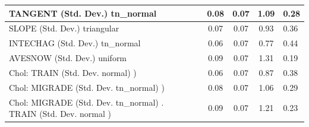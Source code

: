 \begin{table}
\begin{center}
\begin{tabular}{|l|l|c|c|c|l|}
			\hline
			TANGENT (Std. Dev.) tn_normal &  & 0.08 & 0.07 & 1.09 & 0.28 \\
			\hline
			SLOPE (Std. Dev.) triangular &  & 0.07 & 0.07 & 0.93 & 0.36 \\
			\hline
			INTECHAG (Std. Dev.) tn_normal &  & 0.06 & 0.07 & 0.77 & 0.44 \\
			\hline
			AVESNOW (Std. Dev.) uniform &  & 0.09 & 0.07 & 1.31 & 0.19 \\
			\hline
			 Chol: TRAIN (Std. Dev. normal) ) &  & 0.06 & 0.07 & 0.87 & 0.38 \\
			\hline
			 Chol: MIGRADE (Std. Dev. tn_normal) ) &  & 0.08 & 0.07 & 1.06 & 0.29 \\
			\hline
			 Chol: MIGRADE (Std. Dev. tn_normal) . TRAIN (Std. Dev.   normal ) &  & 0.09 & 0.07 & 1.21 & 0.23 \\
			\hline
		\end{tabular}
	\end{center}
\end{table}
